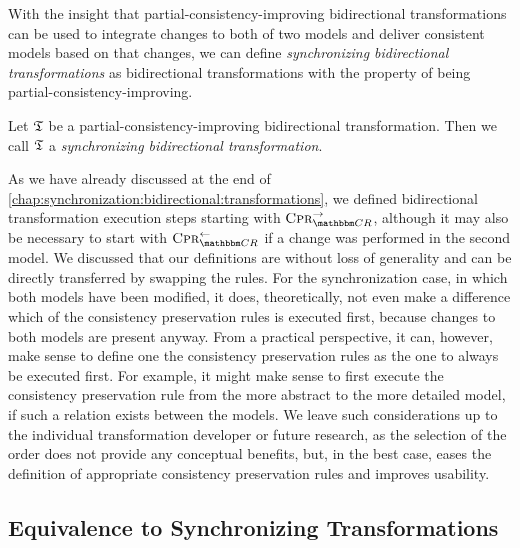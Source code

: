 With the insight that partial-consistency-improving bidirectional transformations can be used to integrate changes to both of two models and deliver consistent models based on that changes, we can define \emph{synchronizing bidirectional transformations} as bidirectional transformations with the property of being partial-consistency-improving.

\begin{definition}
    Let $\mathfrak{T}$ be a partial-consistency-improving bidirectional transformation.
    Then we call $\mathfrak{T}$ a \emph{synchronizing bidirectional transformation}.
\end{definition}

As we have already discussed at the end of \autoref{chap:synchronization:bidirectional:transformations}, we defined bidirectional transformation execution steps starting with $\consistencypreservationrule{\consistencyrelationset{CR}}^{\rightarrow}$, although it may also be necessary to start with $\consistencypreservationrule{\consistencyrelationset{CR}}^{\leftarrow}$ if a change was performed in the second model.
We discussed that our definitions are without loss of generality and can be directly transferred by swapping the rules.
For the synchronization case, in which both models have been modified, it does, theoretically, not even make a difference which of the consistency preservation rules is executed first, because changes to both models are present anyway.
From a practical perspective, it can, however, make sense to define one the consistency preservation rules as the one to always be executed first.
For example, it might make sense to first execute the consistency preservation rule from the more abstract to the more detailed model, if such a relation exists between the models.
We leave such considerations up to the individual transformation developer or future research, as the selection of the order does not provide any conceptual benefits, but, in the best case, eases the definition of appropriate consistency preservation rules and improves usability.



\subsection{Equivalence to Synchronizing Transformations}

